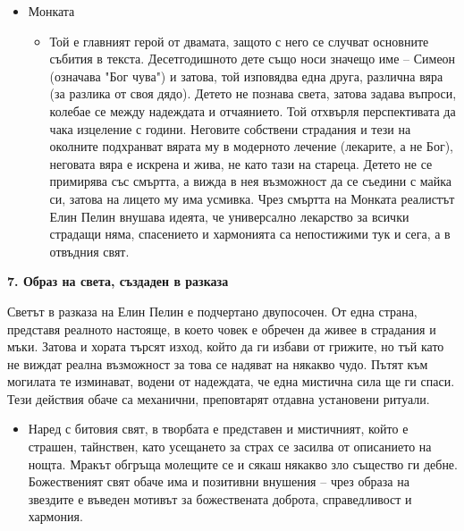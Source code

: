 \documentclass[12pt,a4paper]{article}
\begin{document}
\begin{itemize}[leftmargin=*, noitemsep, topsep=2pt, parsep=0pt]
    \item Монката
    \begin{itemize}[leftmargin=*]
        \item Той е главният герой от двамата, защото с него се случват основните събития в текста. Десетгодишното дете също носи значещо име – Симеон (означава "Бог чува") и затова, той изповядва една друга, различна вяра (за разлика от своя дядо). Детето не познава света, затова задава въпроси, колебае се между надеждата и отчаянието. Той отхвърля перспективата да чака изцеление с години. Неговите собствени страдания и тези на околните подхранват вярата му в модерното лечение (лекарите, а не Бог), неговата вяра е искрена и жива, не като тази на стареца. Детето не се примирява със смъртта, а вижда в нея възможност да се съедини с майка си, затова на лицето му има усмивка. Чрез смъртта на Монката реалистът Елин Пелин внушава идеята, че универсално лекарство за всички страдащи няма, спасението и хармонията са непостижими тук и сега, а в отвъдния свят.
    \end{itemize}
\end{itemize}

\vspace{0.1cm}
 
\noindent 
\textbf{7. Образ на света, създаден в разказа}
\vspace{0.1cm}
 
\indent Светът в разказа на Елин Пелин е подчертано двупосочен. От една страна, представя реалното настояще, в което човек е обречен да живее в страдания и мъки. Затова и хората търсят изход, който да ги избави от грижите, но тъй като не виждат реална възможност за това се надяват на някакво чудо. Пътят към могилата те изминават, водени от надеждата, че една мистична сила ще ги спаси. Тези действия обаче са механични, преповтарят отдавна установени ритуали.

\begin{itemize}[leftmargin=*]
\vspace{-0.2cm}
\item Наред с битовия свят, в творбата е представен и мистичният, който е страшен, тайнствен, като усещането за страх се засилва от описанието на нощта. Мракът обгръща молещите се и сякаш някакво зло същество ги дебне. Божественият свят обаче има и позитивни внушения – чрез образа на звездите е въведен мотивът за божествената доброта, справедливост и хармония.
\end{itemize}
\end{document}
